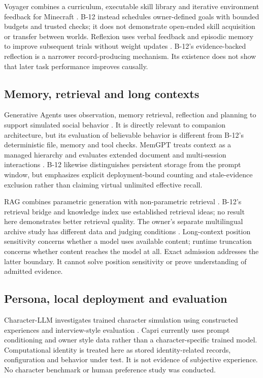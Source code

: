 \documentclass[11pt,a4paper]{article}
\begin{document}
Voyager combines a curriculum, executable skill library and iterative environment feedback for Minecraft \cite{voyager}. B-12 instead schedules owner-defined goals with bounded budgets and trusted checks; it does not demonstrate open-ended skill acquisition or transfer between worlds. Reflexion uses verbal feedback and episodic memory to improve subsequent trials without weight updates \cite{reflexion}. B-12's evidence-backed reflection is a narrower record-producing mechanism. Its existence does not show that later task performance improves causally.

\subsection{Memory, retrieval and long contexts}
Generative Agents uses observation, memory retrieval, reflection and planning to support simulated social behavior \cite{generative}. It is directly relevant to companion architecture, but its evaluation of believable behavior is different from B-12's deterministic file, memory and tool checks. MemGPT treats context as a managed hierarchy and evaluates extended document and multi-session interactions \cite{memgpt}. B-12 likewise distinguishes persistent storage from the prompt window, but emphasizes explicit deployment-bound counting and stale-evidence exclusion rather than claiming virtual unlimited effective recall.

RAG combines parametric generation with non-parametric retrieval \cite{rag}. B-12's retrieval bridge and knowledge index use established retrieval ideas; no result here demonstrates better retrieval quality. The owner's separate multilingual archive study has different data and judging conditions \cite{archive}. Long-context position sensitivity \cite{lost} concerns whether a model uses available content; runtime truncation concerns whether content reaches the model at all. Exact admission addresses the latter boundary. It cannot solve position sensitivity or prove understanding of admitted evidence.

\subsection{Persona, local deployment and evaluation}
Character-LLM investigates trained character simulation using constructed experiences and interview-style evaluation \cite{character}. Capri currently uses prompt conditioning and owner style data rather than a character-specific trained model. Computational identity is treated here as stored identity-related records, configuration and behavior under test. It is not evidence of subjective experience. No character benchmark or human preference study was conducted.
\end{document}
